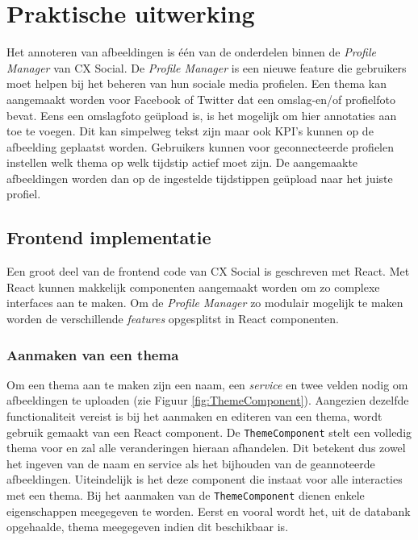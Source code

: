 
\chapter{Praktische uitwerking}
\vspace{-3cm}
Het annoteren van afbeeldingen is \'{e}\'{e}n van de onderdelen binnen de \textit{Profile Manager} van CX Social. De \textit{Profile Manager} is een nieuwe feature die gebruikers moet helpen bij het beheren van hun sociale media profielen. Een thema kan aangemaakt worden voor Facebook of Twitter dat een omslag-en/of profielfoto bevat. Eens een omslagfoto ge\"{u}pload is, is het mogelijk om hier annotaties aan toe te voegen. Dit kan simpelweg tekst zijn maar ook KPI's kunnen op de afbeelding geplaatst worden. Gebruikers kunnen voor geconnecteerde profielen instellen welk thema op welk tijdstip actief moet zijn. De aangemaakte afbeeldingen worden dan op de ingestelde tijdstippen ge\"{u}pload naar het juiste profiel. 


\section{Frontend implementatie}
Een groot deel van de frontend code van CX Social is geschreven met React. Met React kunnen makkelijk componenten aangemaakt worden om zo complexe interfaces aan te maken. Om de \textit{Profile Manager} zo modulair mogelijk te maken worden de verschillende \textit{features} opgesplitst in React componenten. 

\subsection{Aanmaken van een thema} \label{AanmakenVanEenThema}

Om een thema aan te maken zijn een naam, een \textit{service} %
en twee velden nodig om afbeeldingen te uploaden (zie Figuur \ref{fig:ThemeComponent}). Aangezien dezelfde functionaliteit vereist is bij het aanmaken en editeren van een thema, wordt gebruik gemaakt van een React component. De \texttt{ThemeComponent} stelt een volledig thema voor en zal alle veranderingen hieraan afhandelen. Dit betekent dus zowel het ingeven van de naam en service als het bijhouden van de geannoteerde afbeeldingen. Uiteindelijk is het deze component die instaat voor alle interacties met een thema. 
Bij het aanmaken van de \texttt{ThemeComponent} dienen enkele eigenschappen meegegeven te worden. Eerst en vooral wordt het, uit de databank opgehaalde, thema meegegeven indien dit beschikbaar is. %

